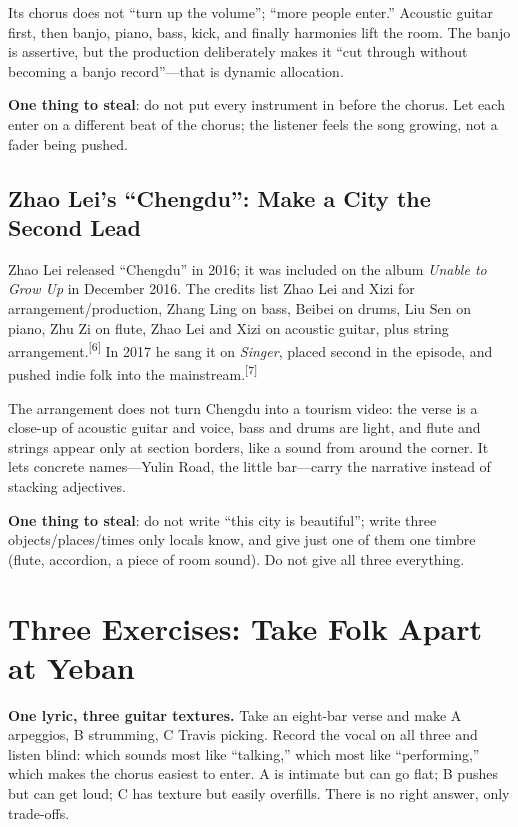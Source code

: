 Its chorus does not ``turn up the volume''; ``more people enter.'' Acoustic guitar first, then banjo, piano, bass, kick, and finally harmonies lift the room. The banjo is assertive, but the production deliberately makes it ``cut through without becoming a banjo record''---that is dynamic allocation.

\textbf{One thing to steal}: do not put every instrument in before the chorus. Let each enter on a different beat of the chorus; the listener feels the song growing, not a fader being pushed.

\subsection{Zhao Lei's ``Chengdu'': Make a City the Second Lead}
\label{sec:folk-case-chengdu}

Zhao Lei released ``Chengdu'' in 2016; it was included on the album \emph{Unable to Grow Up} in December 2016. The credits list Zhao Lei and Xizi for arrangement/production, Zhang Ling on bass, Beibei on drums, Liu Sen on piano, Zhu Zi on flute, Zhao Lei and Xizi on acoustic guitar, plus string arrangement.{\textsuperscript{[6]}} In 2017 he sang it on \emph{Singer}, placed second in the episode, and pushed indie folk into the mainstream.{\textsuperscript{[7]}}

The arrangement does not turn Chengdu into a tourism video: the verse is a close-up of acoustic guitar and voice, bass and drums are light, and flute and strings appear only at section borders, like a sound from around the corner. It lets concrete names---Yulin Road, the little bar---carry the narrative instead of stacking adjectives.

\textbf{One thing to steal}: do not write ``this city is beautiful''; write three objects/places/times only locals know, and give just one of them one timbre (flute, accordion, a piece of room sound). Do not give all three everything.

\section{Three Exercises: Take Folk Apart at Yeban}
\label{sec:folk-practice}

\begin{exercise}
\textbf{One lyric, three guitar textures.} Take an eight-bar verse and make A arpeggios, B strumming, C Travis picking. Record the vocal on all three and listen blind: which sounds most like ``talking,'' which most like ``performing,'' which makes the chorus easiest to enter. A is intimate but can go flat; B pushes but can get loud; C has texture but easily overfills. There is no right answer, only trade-offs.
\end{exercise}

